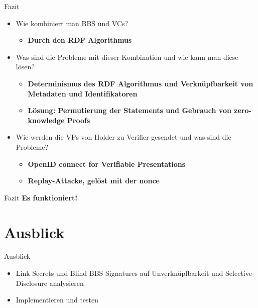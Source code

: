 \documentclass[
	german,%
	authorontitle=true,
	]{bfhbeamer}
\begin{document}
\begin{frame}{Fazit}
    \begin{itemize}
        \item Wie kombiniert man BBS und VCs?
        \begin{itemize}
            \item \textbf{Durch den RDF Algorithmus}
        \end{itemize}
        \item Was sind die Probleme mit dieser Kombination und wie kann man diese lösen?
        \begin{itemize}
            \item \textbf{Determinismus des RDF Algorithmus und Verknüpfbarkeit von Metadaten und Identifikatoren}
            \item \textbf{Lösung: Permutierung der Statements und Gebrauch von zero-knowledge Proofs}
        \end{itemize}
        \item Wie werden die VPs von Holder zu Verifier gesendet und was sind die Probleme?
        \begin{itemize}
            \item \textbf{OpenID connect for Verifiable Presentations}
            \item \textbf{Replay-Attacke, gelöst mit der nonce}
        \end{itemize}
    \end{itemize}
\end{frame}

\begin{frame}{Fazit}
    \centering
    \textbf{\huge Es funktioniert!}
\end{frame}

\section{Ausblick}

\begin{frame}{Ausblick}
    \begin{itemize}
        \item Link Secrets und Blind BBS Signatures auf Unverknüpfbarkeit und Selective-Disclosure analysieren
        \item Implementieren und testen
    \end{itemize}
\end{frame}
\end{document}
